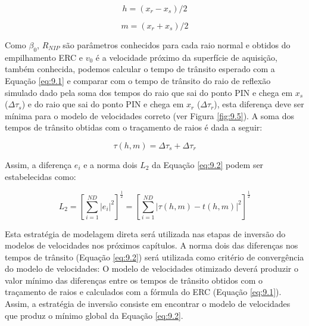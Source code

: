 \begin{equation}
\label{eq:9.3}
h = (x_r-x_s)/2
\end{equation}

\begin{equation}
\label{eq:9.4}
m = (x_r+x_s)/2
\end{equation}

Como $\beta_0$, $R_{NIP}$ são parâmetros conhecidos para cada raio normal e obtidos do empilhamento
ERC e $v_0$ é a velocidade próximo da superfície de aquisição, também conhecida, podemos calcular o
tempo de trânsito esperado com a Equação \ref{eq:9.1} e comparar com o tempo de trânsito do raio de
reflexão simulado
dado pela soma dos tempos do raio que sai do ponto PIN e chega em $x_s$ ($\Delta \tau_s$)
e do raio
que sai do ponto PIN e chega em $x_r$ ($\Delta \tau_r$), esta diferença deve ser mínima para o modelo de velocidades
correto (ver Figura \ref{fig:9.5}). A soma dos tempos de trânsito obtidas com o
traçamento de raios é dada a seguir:

\begin{equation}
\label{eq:9.5}
\tau(h,m) = \Delta \tau_s + \Delta \tau_r
\end{equation}

Assim, a diferença $e_i$ e a norma dois $L_2$ da Equação \ref{eq:9.2} podem ser estabelecidas como:

\begin{equation}
\label{eq:9.6}
L_2 = \left[ \sum_{i=1}^{ND} |e_i|^2 \right]^\frac{1}{2}
= \left[ \sum_{i=1}^{ND} |\tau(h,m)-t(h,m)|^2 \right]^\frac{1}{2}
\end{equation}

Esta estratégia de modelagem direta será utilizada nas etapas de inversão do modelos de velocidades nos
próximos capítulos. A norma dois das diferenças nos tempos de trânsito (Equação \ref{eq:9.2})
será utilizada como critério de
convergência do modelo de velocidades: O modelo de velocidades otimizado deverá produzir
o valor mínimo das diferenças entre os tempos de trânsito obtidos com o traçamento de raios
e calculados com a fórmula do ERC (Equação \ref{eq:9.1}). Assim, a estratégia de inversão consiste em
encontrar o modelo de velocidades que produz o mínimo global da Equação \ref{eq:9.2}.


